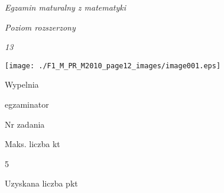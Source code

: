 \documentclass[a4paper,12pt]{article}
\begin{document}
{\it Egzamin maturalny z matematyki}

{\it Poziom rozszerzony}

{\it 13}
\begin{center}
\texttt{[image: ./F1\_M\_PR\_M2010\_page12\_images/image001.eps]}
\end{center}
Wypelnia

egzaminator

Nr zadania

Maks. liczba kt

5

Uzyskana liczba pkt
\end{document}

